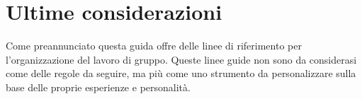 \documentclass[11pt,a4paper]{article}
\begin{document}
	\section{Ultime considerazioni}
	Come preannunciato questa guida offre delle linee di riferimento per l'organizzazione del lavoro di gruppo. Queste linee guide non sono da considerasi come delle regole da seguire, ma più come uno strumento da personalizzare sulla base delle proprie esperienze e personalità. \\
	
	
\end{document}
